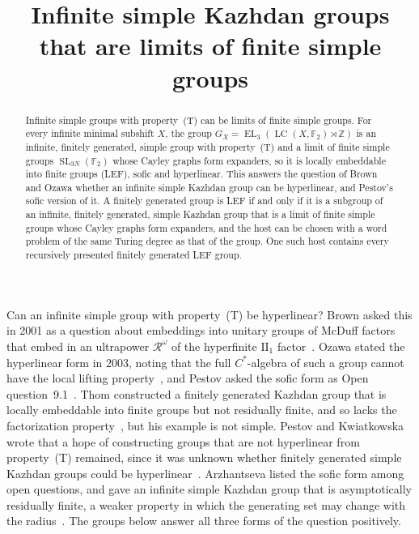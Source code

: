 \documentclass[11pt]{amsart}
\newcommand{\F}{\mathbb F}
\newcommand{\Z}{\mathbb Z}
\newcommand{\LC}{\operatorname{LC}}
\newcommand{\EL}{\operatorname{EL}}
\newcommand{\SL}{\operatorname{SL}}
\begin{document}
\title{Infinite simple Kazhdan groups that are limits of finite simple groups}
\author{\paperauthorname}
\date{}

\begin{abstract}
Infinite simple groups with property~\textup{(T)} can be limits of finite
simple groups. For every infinite minimal subshift $X$, the group
$G_X=\EL_3(\LC(X,\F_2)\rtimes\Z)$ is an infinite, finitely generated,
simple group with property~\textup{(T)} and a limit of finite simple groups
$\SL_{3N}(\F_2)$ whose Cayley graphs form expanders, so it is locally
embeddable into finite groups (LEF), sofic and hyperlinear. This answers
the question of Brown and Ozawa whether an infinite simple Kazhdan group
can be hyperlinear, and Pestov's sofic version of it.
A finitely generated group is LEF if and only if it is a subgroup of an
infinite, finitely generated, simple Kazhdan group that is a limit of
finite simple groups whose Cayley graphs form expanders, and the host can
be chosen with a word problem of the same Turing degree as that of the
group. One such host contains every recursively presented finitely
generated LEF group.
\end{abstract}
\maketitle

Can an infinite simple group with property~\textup{(T)} be hyperlinear?
Brown asked this in 2001 as a question about embeddings into unitary
groups of McDuff factors that embed in an ultrapower $\mathcal R^\omega$
of the hyperfinite $\mathrm{II}_1$ factor~\cite[\S11, Question~7]{Brown}.
Ozawa stated the hyperlinear form in 2003, noting that the full
$C^*$-algebra of such a group cannot have the local lifting
property~\cite[\S7]{Ozawa}, and Pestov asked the sofic form as Open
question~9.1~\cite{Pestov}. Thom constructed a finitely generated Kazhdan
group that is locally embeddable into finite groups but not residually
finite, and so lacks the factorization property~\cite{Thom}, but his
example is not simple. Pestov and Kwiatkowska wrote that a hope of
constructing groups that are not hyperlinear from property~\textup{(T)}
remained, since it was unknown whether finitely generated simple Kazhdan
groups could be hyperlinear~\cite{PestovKwiatkowska}. Arzhantseva listed
the sofic form among open questions, and gave an infinite simple Kazhdan
group that is asymptotically residually finite, a weaker property in which
the generating set may change with the radius~\cite[\S3]{Arzhantseva}. The
groups below answer all three forms of the question positively.
\end{document}
